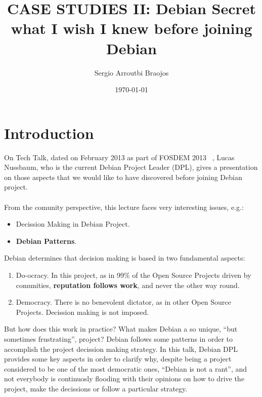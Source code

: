 \documentclass[11pt]{article}
\title{\textbf{CASE STUDIES II: Debian Secret what I wish I knew before joining Debian}}
\author{Sergio Arroutbi Braojos}
\date{\today}
\begin{document}
\maketitle

\section{Introduction}
On Tech Talk, dated on February 2013 as part of FOSDEM 2013 ~\cite{FOSS00}, Lucas Nussbaum, who is the current Debian Project Leader (DPL), gives a presentation on those aspects that we would like to have discovered before joining Debian project.\\
\\
From the comunity perspective, this lecture faces very interesting issues, e.g.:
\begin{itemize}
\item{Decission Making in Debian Project}.
\item{\textbf{Debian Patterns}}.
\end{itemize}
Debian determines that decision making is based in two fundamental aspects:
\begin{enumerate}\itemsep0pt
\item{Do-ocracy}. In this project, as in 99\% of the Open Source Projects driven by comunities, \textbf{reputation follows work}, and never the other way round.
\item{Democracy}. There is no benevolent dictator, as in other Open Source Projects. Decission making is not imposed.
\end{enumerate}

But how does this work in practice? What makes Debian a so unique, ``but sometimes frustrating'', project? Debian follows some patterns in order to accomplish the project decission making strategy. In this talk, Debian DPL provides some key aspects in order to clarify why, despite being a project considered to be one of the most democratic ones, ``Debian is not a rant'', and not everybody is continuosly flooding with their opinions on how to drive the project, make the decissions or follow a particular strategy.
\end{document}
